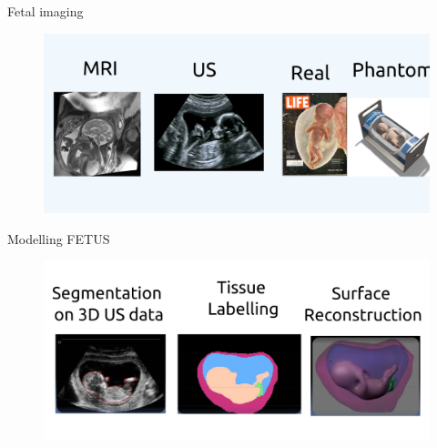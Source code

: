 {
\begin{frame}{Fetal imaging}
      \begin{figure}
        \centering
        \includegraphics[width=1.0\textwidth]{./figures/fetus-images/versions/drawing-v00.png}
      \end{figure}
\end{frame}
}


{


\begin{frame}{Modelling FETUS}
      \begin{figure}
        \centering
        \includegraphics[width=1.0\textwidth]{./figures/segmentation/versions/drawing-v00.png}
      \end{figure}
\end{frame}
}




